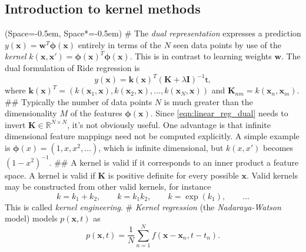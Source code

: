 \documentclass[12pt, a4paper]{article}
\newcommand{\listSpace}{-0.5em}%
\newcommand{\R}{\mathbb{R}}
\newcommand{\vect}[1]{\bm{#1}}
\begin{document}
\subsection*{Introduction to kernel methods}
\begin{easylist}[itemize]
	\ListProperties(Space=\listSpace, Space*=\listSpace)
	# The \emph{dual representation} expresses a prediction $y(\vect{x}) = \vect{w}^T \vect{\phi}(\vect{x})$ entirely in terms of the $N$ seen data points by use of the \emph{kernel} $k(\vect{x}, \vect{x}') = \vect{\phi}(\vect{x})^T \vect{\phi}(\vect{x})$.
	This is in contrast to learning weights $\vect{w}$.
	The dual formulation of Ride regression is
	\begin{equation}
	\label{eqn:linear_reg_dual}
		y(\vect{x}) = \vect{k}(\vect{x})^T \left( \vect{K} + \lambda \vect{I} \right)^{-1} \mathsf{t},
	\end{equation}
	where $\vect{k}(\vect{x})^T = 
	(k(\vect{x}_1, \vect{x}),
	k(\vect{x}_2, \vect{x}),
	\ldots,
	k(\vect{x}_N, \vect{x}))$
	and $\vect{K}_{nm} = k(\vect{x}_n, \vect{x}_m)$.
	## Typically the number of data points $N$ is much greater than the dimensionality $M$ of the features $\vect{\phi}(\vect{x})$.
	Since \eqref{eqn:linear_reg_dual} needs to invert $\vect{K} \in \R^{N \times N}$, it's not obviously useful.
	One advantage is that infinite dimensional feature mappings need not be computed explicitly.
	A simple example is 
	$\vect{\phi}(x) = (1, x, x^2, \ldots)$, which is infinite dimensional, but $k(x, x')$ becomes $(1 - x^2)^{-1}$. 
	## A kernel is valid if it corresponds to an inner product a feature space.
	A kernel is valid if $\vect{K}$ is positive definite for every possible $\vect{x}$.
	Valid kernels may be constructed from other valid kernels, for instance
	\begin{equation*}
		k = k_1 + k_2, \qquad k = k_1 k_2, \qquad k = \exp(k_1), \qquad \ldots
	\end{equation*}
	This is called \emph{kernel engineering}.
	# \emph{Kernel regression} (the \emph{Nadaraya-Watson} model) models $p(\vect{x}, t)$ as
	\begin{equation*}
		p(\vect{x}, t) = \frac{1}{N} \sum_{n=1}^{N} f(\vect{x} - \vect{x}_n, t- t_n).
	\end{equation*}
\end{easylist}
\end{document}
